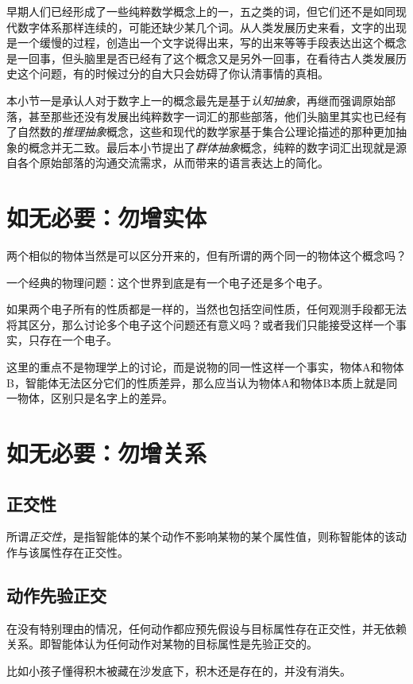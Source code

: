 \documentclass[12pt,oneside]{book}
\begin{document}
早期人们已经形成了一些纯粹数学概念上的一，五之类的词，但它们还不是如同现代数字体系那样连续的，可能还缺少某几个词。从人类发展历史来看，文字的出现是一个缓慢的过程，创造出一个文字说得出来，写的出来等等手段表达出这个概念是一回事，但头脑里是否已经有了这个概念又是另外一回事，在看待古人类发展历史这个问题，有的时候过分的自大只会妨碍了你认清事情的真相。

本小节一是承认人对于数字上一的概念最先是基于\emph{认知抽象}，再继而强调原始部落，甚至那些还没有发展出纯粹数字一词汇的那些部落，他们头脑里其实也已经有了自然数的\emph{推理抽象}概念，这些和现代的数学家基于集合公理论描述的那种更加抽象的概念并无二致。最后本小节提出了\emph{群体抽象}概念，纯粹的数字词汇出现就是源自各个原始部落的沟通交流需求，从而带来的语言表达上的简化。



\section{如无必要：勿增实体}
两个相似的物体当然是可以区分开来的，但有所谓的两个同一的物体这个概念吗？

一个经典的物理问题：这个世界到底是有一个电子还是多个电子。

如果两个电子所有的性质都是一样的，当然也包括空间性质，任何观测手段都无法将其区分，那么讨论多个电子这个问题还有意义吗？或者我们只能接受这样一个事实，只存在一个电子。

这里的重点不是物理学上的讨论，而是说物的同一性这样一个事实，物体A和物体B，智能体无法区分它们的性质差异，那么应当认为物体A和物体B本质上就是同一物体，区别只是名字上的差异。

\section{如无必要：勿增关系}
\subsection{正交性}
所谓\emph{正交性}，是指智能体的某个动作不影响某物的某个属性值，则称智能体的该动作与该属性存在正交性。


\subsection{动作先验正交}
在没有特别理由的情况，任何动作都应预先假设与目标属性存在正交性，并无依赖关系。即智能体认为任何动作对某物的目标属性是先验正交的。

比如小孩子懂得积木被藏在沙发底下，积木还是存在的，并没有消失。
\end{document}
